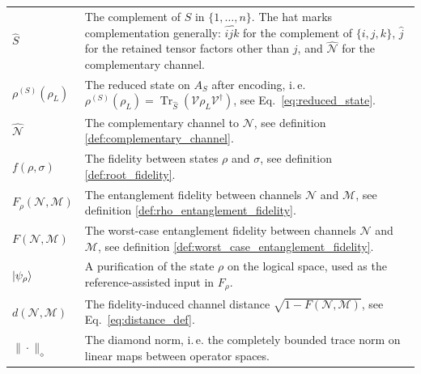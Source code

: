\documentclass[10pt,twocolumn,superscriptaddress,aps,amsmath,amssymb,citeautoscript,floatfix,prx]{revtex4-2}
\theoremstyle{plain}
\theoremstyle{plain}
\theoremstyle{plain}
\theoremstyle{plain}
\theoremstyle{plain}
\theoremstyle{plain}
\theoremstyle{plain}
\theoremstyle{definition}
\theoremstyle{plain}
\begin{document}
\begin{appendix}
\begin{tabular}{@{}ll@{}}
\parbox[t]{0.22\textwidth}{$\hat S$} & \parbox[t]{0.72\textwidth}{The complement of $S$ in $\{1,\ldots,n\}$. The hat marks complementation generally: $\widehat{ijk}$ for the complement of $\{i,j,k\}$, $\widehat j$ for the retained tensor factors other than $j$, and $\widehat{\mathcal N}$ for the complementary channel.} \\[0.6em]

\parbox[t]{0.22\textwidth}{$\rho^{(S)}(\rho_L)$} & \parbox[t]{0.72\textwidth}{The reduced state on $A_S$ after encoding, i.\,e. $\rho^{(S)}(\rho_L)=\operatorname{Tr}_{\hat S}(\mathcal{V}\rho_L\mathcal{V}^\dagger)$, see Eq.~\eqref{eq:reduced_state}.} \\[0.6em]

\parbox[t]{0.22\textwidth}{$\widehat{\mathcal{N}}$} & \parbox[t]{0.72\textwidth}{The complementary channel to $\mathcal{N}$, see definition \ref{def:complementary_channel}.} \\[0.6em]

\parbox[t]{0.22\textwidth}{$f(\rho, \sigma)$} & \parbox[t]{0.72\textwidth}{The fidelity between states $\rho$ and $\sigma$, see definition \ref{def:root_fidelity}.} \\[0.6em]

\parbox[t]{0.22\textwidth}{$F_{\rho}(\mathcal{N}, \mathcal{M})$} & \parbox[t]{0.72\textwidth}{The entanglement fidelity between channels $\mathcal{N}$ and $\mathcal{M}$, see definition \ref{def:rho_entanglement_fidelity}.} \\[0.6em]

\parbox[t]{0.22\textwidth}{$F(\mathcal{N}, \mathcal{M})$} & \parbox[t]{0.72\textwidth}{The worst-case entanglement fidelity between channels $\mathcal{N}$ and $\mathcal{M}$, see definition \ref{def:worst_case_entanglement_fidelity}.} \\[0.6em]

\parbox[t]{0.22\textwidth}{$\ket{\psi_\rho}$} & \parbox[t]{0.72\textwidth}{A purification of the state $\rho$ on the logical space, used as the reference-assisted input in $F_\rho$.} \\[0.6em]

\parbox[t]{0.22\textwidth}{$d(\mathcal N,\mathcal M)$} & \parbox[t]{0.72\textwidth}{The fidelity-induced channel distance $\sqrt{1-F(\mathcal N,\mathcal M)}$, see Eq.~\eqref{eq:distance_def}.} \\[0.6em]

\parbox[t]{0.22\textwidth}{$\|\cdot\|_\diamond$} & \parbox[t]{0.72\textwidth}{The diamond norm, i.\,e. the completely bounded trace norm on linear maps between operator spaces.} \\[0.6em]


\end{tabular}
\end{appendix}
\end{document}
